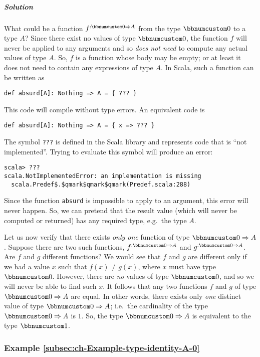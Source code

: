 \subparagraph{Solution}

What could be a function $f^{:\bbnum 0\Rightarrow A}$ from the type
$\bbnum 0$ to a type $A$? Since there exist no values of type $\bbnum 0$,
the function $f$ will never be applied to any arguments and so \emph{does
not need} to compute any actual values of type $A$. So, $f$ is a
function whose body may be empty; or at least it does not need to
contain any expressions of type $A$. In Scala, such a function can
be written as
\begin{lstlisting}
def absurd[A]: Nothing => A = { ??? }
\end{lstlisting}
This code will compile without type errors. An equivalent code is
\begin{lstlisting}
def absurd[A]: Nothing => A = { x => ??? }
\end{lstlisting}
The symbol \lstinline!???! is defined in the Scala library and represents
code that is ``not implemented''. Trying to evaluate this symbol
will produce an error:
\begin{lstlisting}
scala> ???
scala.NotImplementedError: an implementation is missing
  scala.Predef$.$qmark$qmark$qmark(Predef.scala:288) 
\end{lstlisting}
Since the function \lstinline!absurd! is impossible to apply to an
argument, this error will never happen. So, we can pretend that the
result value (which will never be computed or returned) has any required
type, e.g.~the type $A$.

Let us now verify that there exists \emph{only one} function of type
$\bbnum 0\Rightarrow A$. Suppose there are two such functions, $f^{:\bbnum 0\Rightarrow A}$
and $g^{:\bbnum 0\Rightarrow A}$. Are $f$ and $g$ different functions?
We would see that $f$ and $g$ are different only if we had a value
$x$ such that $f(x)\neq g(x)$, where $x$ must have type $\bbnum 0$.
However, there are \emph{no} values of type $\bbnum 0$, and so we
will never be able to find such $x$. It follows that any two functions
$f$ and $g$ of type $\bbnum 0\Rightarrow A$ are equal. In other
words, there exists only \emph{one} distinct value of type $\bbnum 0\Rightarrow A$;
i.e.~the cardinality of the type $\bbnum 0\Rightarrow A$ is $1$.
So, the type $\bbnum 0\Rightarrow A$ is equivalent to the type $\bbnum 1$.

\subsubsection{Example \label{subsec:ch-Example-type-identity-A-0}\ref{subsec:ch-Example-type-identity-A-0}}

